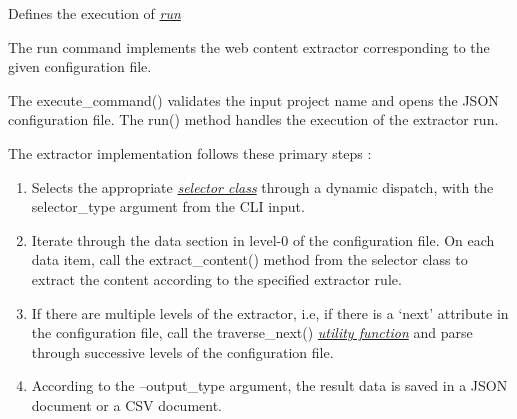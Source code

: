 \documentclass[letterpaper,12pt,english]{sphinxmanual}
\begin{document}
\begin{fulllineitems}
\label{implementation/commands:scrapple.commands.run.RunCommand}
Defines the execution of {\hyperref[framework/commands:command-run]{\emph{run}}}

\begin{fulllineitems}
\label{implementation/commands:scrapple.commands.run.RunCommand.execute_command}
The run command implements the web content extractor corresponding to the given         configuration file.

The execute\_command() validates the input project name and opens the JSON         configuration file. The run() method handles the execution of the extractor run.

The extractor implementation follows these primary steps :
\begin{enumerate}
\item {} 
Selects the appropriate {\hyperref[implementation/selectors:implementation-selectors]{\emph{selector class}}} through         a dynamic dispatch, with the selector\_type argument from the CLI input.

\item {} 
Iterate through the data section in level-0 of the configuration file.         On each data item, call the extract\_content() method from the selector class to         extract the content according to the specified extractor rule.

\item {} 
If there are multiple levels of the extractor, i.e, if there is a `next'         attribute in the configuration file, call the traverse\_next()         {\hyperref[implementation/utils:implementation-utils]{\emph{utility function}}} and parse through successive levels         of the configuration file.

\item {} 
According to the --output\_type argument, the result data is saved in a JSON         document or a CSV document.

\end{enumerate}

\end{fulllineitems}


\end{fulllineitems}
\end{document}

